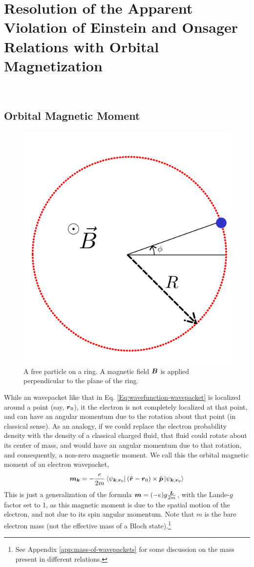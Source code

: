 \documentclass{report}
\renewcommand\vec[1]{\ensuremath\boldsymbol{#1}} %
\begin{document}
\chapter{Resolution of the Apparent Violation of Einstein and Onsager Relations with Orbital Magnetization}~\label{chap:OrbMag}

\section{Orbital Magnetic Moment} \label{sec:OrbMagMom}
\begin{figure}
	\centering
	\includegraphics[width=0.3\linewidth]{particle-on-a-ring}
	\caption{A free particle on a ring. A magnetic field $\vec{B}$ is applied perpendicular to the plane of the ring.}
	\label{fig:particle-on-a-ring}
\end{figure}
While an wavepacket like that in Eq. \eqref{Eq:wavefunction-wavepacket} is localized around a point (say, $\vec{r}_0$), it the electron is not completely localized at that point, and can have an angular momentum due to the rotation about that point (in classical sense). As an analogy, if we could replace the electron probability density with the density of a classical charged fluid, that fluid could rotate about its center of mass, and would have an angular momentum due to that rotation, and consequently, a non-zero magnetic moment. We call this the orbital magnetic moment of an electron wavepacket,
\begin{equation}\label{Eq:OrbitalMagneticMomentExpression}
	\vec{m}_{\vec{k}} = -\frac{e}{2 m} \bra{\psi_{\vec{k}, \vec{r}_0}}(\hat{\vec{r}} - \vec{r}_0)\times\hat{\vec{p}}\ket{\psi_{\vec{k}, \vec{r}_0}}
\end{equation}
This is just a generalization of the formula $\vec{m} = (-e)g \frac{\vec{L}}{2 m}$, with the Lande-$g$ factor set to 1, as this magnetic moment is due to the spatial motion of the electron, and not due to its spin angular momentum.
Note that $m$ is the bare electron mass (not the effective mass of a Bloch state).\footnote{See Appendix \ref{app:mass-of-wavepackets} for some discussion on the mass present in different relations.}
\end{document}
